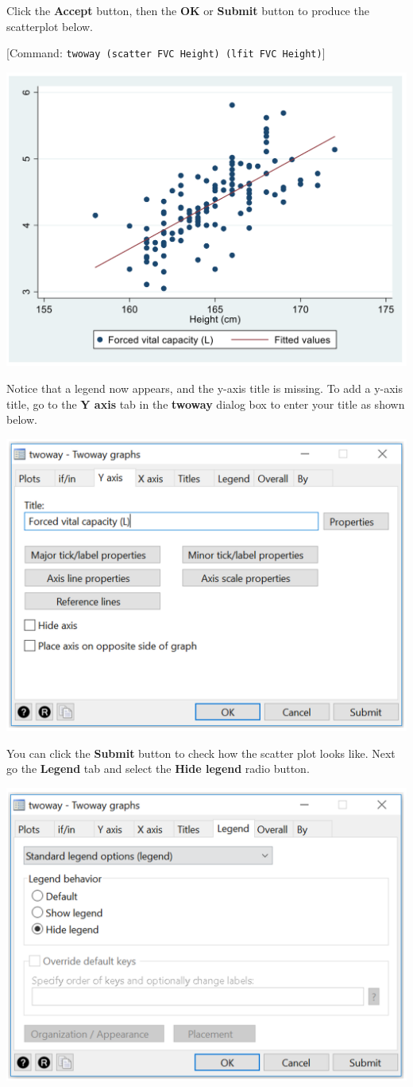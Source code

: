 \documentclass[
]{memoir}
\begin{document}
Click the \textbf{Accept} button, then the \textbf{OK} or \textbf{Submit} button to produce the scatterplot below.

{[}Command: \texttt{twoway\ (scatter\ FVC\ Height)\ (lfit\ FVC\ Height)}{]}

\includegraphics[width=0.66\linewidth]{img/mod08/stata/scatter-1}

Notice that a legend now appears, and the y-axis title is missing. To add a y-axis title, go to the \textbf{Y axis} tab in the \textbf{twoway} dialog box to enter your title as shown below.

\includegraphics[width=0.66\linewidth]{img/mod08/stata/twoway-5}

You can click the \textbf{Submit} button to check how the scatter plot looks like. Next go the \textbf{Legend} tab and select the \textbf{Hide legend} radio button.

\includegraphics[width=0.66\linewidth]{img/mod08/stata/twoway-6}
\end{document}
